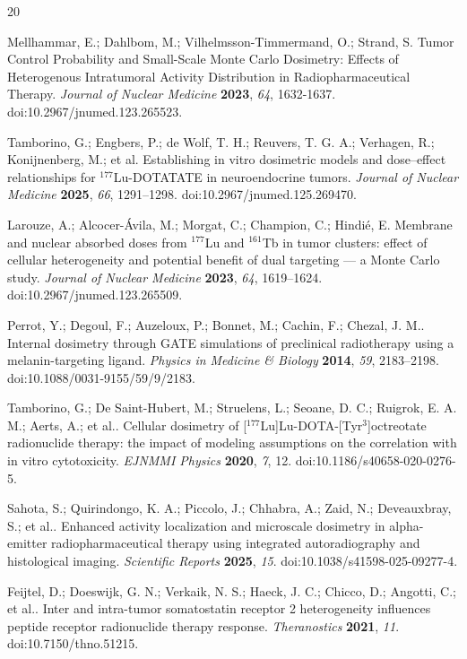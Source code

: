 \documentclass[11pt]{article}
\begin{document}
\begin{thebibliography}{20}
\small

 Mellhammar, E.; Dahlbom, M.; Vilhelmsson-Timmermand, O.; Strand, S. Tumor Control Probability and Small-Scale Monte Carlo Dosimetry: Effects of Heterogenous Intratumoral Activity Distribution in Radiopharmaceutical Therapy. \textit{Journal of Nuclear Medicine} \textbf{2023}, \textit{64}, 1632-1637. doi:10.2967/jnumed.123.265523.

 Tamborino, G.; Engbers, P.; de Wolf, T. H.; Reuvers, T. G. A.; Verhagen, R.; Konijnenberg, M.; et al. Establishing in vitro dosimetric models and dose--effect relationships for $^{177}$Lu-DOTATATE in neuroendocrine tumors. \textit{Journal of Nuclear Medicine} \textbf{2025}, \textit{66}, 1291--1298. doi:10.2967/jnumed.125.269470.

 Larouze, A.; Alcocer-\'Avila, M.; Morgat, C.; Champion, C.; Hindi\'e, E. Membrane and nuclear absorbed doses from $^{177}$Lu and $^{161}$Tb in tumor clusters: effect of cellular heterogeneity and potential benefit of dual targeting --- a Monte Carlo study. \textit{Journal of Nuclear Medicine} \textbf{2023}, \textit{64}, 1619--1624. doi:10.2967/jnumed.123.265509.

 Perrot, Y.; Degoul, F.; Auzeloux, P.; Bonnet, M.; Cachin, F.; Chezal, J. M.. Internal dosimetry through GATE simulations of preclinical radiotherapy using a melanin-targeting ligand. \textit{Physics in Medicine \& Biology} \textbf{2014}, \textit{59}, 2183--2198. doi:10.1088/0031-9155/59/9/2183.

 Tamborino, G.; De Saint-Hubert, M.; Struelens, L.; Seoane, D. C.; Ruigrok, E. A. M.; Aerts, A.; et al.. Cellular dosimetry of [$^{177}$Lu]Lu-DOTA-[Tyr$^3$]octreotate radionuclide therapy: the impact of modeling assumptions on the correlation with in vitro cytotoxicity. \textit{EJNMMI Physics} \textbf{2020}, \textit{7}, 12. doi:10.1186/s40658-020-0276-5.

 Sahota, S.; Quirindongo, K. A.; Piccolo, J.; Chhabra, A.; Zaid, N.; Deveauxbray, S.; et al.. Enhanced activity localization and microscale dosimetry in alpha-emitter radiopharmaceutical therapy using integrated autoradiography and histological imaging. \textit{Scientific Reports} \textbf{2025}, \textit{15}. doi:10.1038/s41598-025-09277-4.

 Feijtel, D.; Doeswijk, G. N.; Verkaik, N. S.; Haeck, J. C.; Chicco, D.; Angotti, C.; et al.. Inter and intra-tumor somatostatin receptor 2 heterogeneity influences peptide receptor radionuclide therapy response. \textit{Theranostics} \textbf{2021}, \textit{11}. doi:10.7150/thno.51215.


\end{thebibliography}
\end{document}
